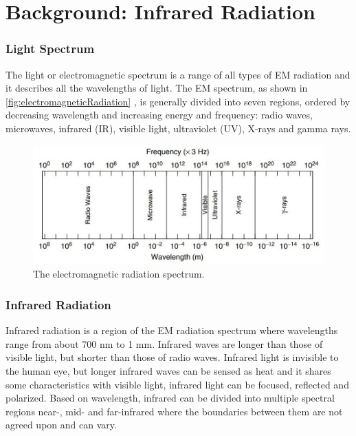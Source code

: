 \section{Background: Infrared Radiation}
\subsubsection{Light Spectrum}
The light or electromagnetic spectrum is a range of all types of EM radiation and it describes all the wavelengths of light. 
The EM spectrum, as shown in \autoref{fig:electromagneticRadiation} \parencite{electromagnetic}, is generally divided into seven regions, ordered by decreasing wavelength and increasing energy and frequency: radio waves, microwaves, infrared (IR), visible light, ultraviolet (UV), X-rays and gamma rays. 


\begin{figure}[H]
\centering
\includegraphics[scale=0.5]{figures/electromagneticRadiation.JPG}
\caption[The electromagnetic radiation spectrum]{The electromagnetic radiation spectrum.}\label{fig:electromagneticRadiation}
\end{figure}



\subsubsection{Infrared Radiation}
Infrared radiation is a region of the EM radiation spectrum where wavelengths range from about 700 nm to 1 mm. Infrared waves are longer than those of visible light, but shorter than those of radio waves. 
Infrared light is invisible to the human eye, but longer infrared waves can be sensed as heat and it shares some characteristics with visible light, infrared light can be focused, reflected and polarized.
Based on wavelength, infrared can be divided into multiple spectral regions near-, mid- and far-infrared where the boundaries between them are not agreed upon and can vary.
 


